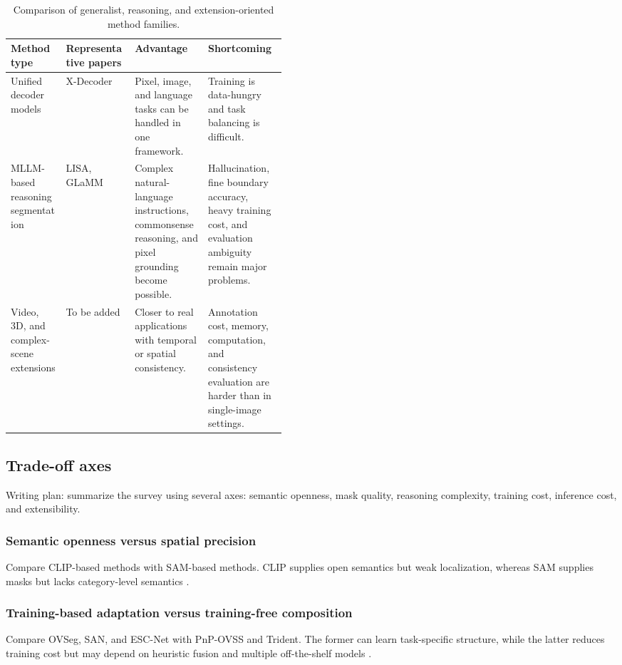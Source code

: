\begin{table}[t]
\centering
\small
\caption{Comparison of generalist, reasoning, and extension-oriented method families.}
\label{tab:method-comparison-generalist}
\begin{tabularx}{\linewidth}{p{0.20\linewidth} p{0.25\linewidth} X X}
\toprule
Method type & Representative papers & Advantage & Shortcoming \\
\midrule
Unified decoder models & X-Decoder \citep{zou2023xdecoder} & Pixel, image, and language tasks can be handled in one framework. & Training is data-hungry and task balancing is difficult. \\
MLLM-based reasoning segmentation & LISA, GLaMM \citep{lai2024lisa,rasheed2024glamm} & Complex natural-language instructions, commonsense reasoning, and pixel grounding become possible. & Hallucination, fine boundary accuracy, heavy training cost, and evaluation ambiguity remain major problems. \\
Video, 3D, and complex-scene extensions & To be added & Closer to real applications with temporal or spatial consistency. & Annotation cost, memory, computation, and consistency evaluation are harder than in single-image settings. \\
\bottomrule
\end{tabularx}
\end{table}

\subsection{Trade-off axes}
\label{subsec:tradeoff-axes}
Writing plan: summarize the survey using several axes: semantic openness, mask quality, reasoning complexity, training cost, inference cost, and extensibility.

\subsubsection{Semantic openness versus spatial precision}
\label{subsubsec:semantic-vs-spatial}
Compare CLIP-based methods with SAM-based methods. CLIP supplies open semantics but weak localization, whereas SAM supplies masks but lacks category-level semantics \citep{liang2023ovseg,xu2023san,kirillov2023sam}.

\subsubsection{Training-based adaptation versus training-free composition}
\label{subsubsec:training-vs-training-free}
Compare OVSeg, SAN, and ESC-Net with PnP-OVSS and Trident. The former can learn task-specific structure, while the latter reduces training cost but may depend on heuristic fusion and multiple off-the-shelf models \citep{liang2023ovseg,xu2023san,lee2025escnet,luo2024pnpovss,shi2025trident}.

